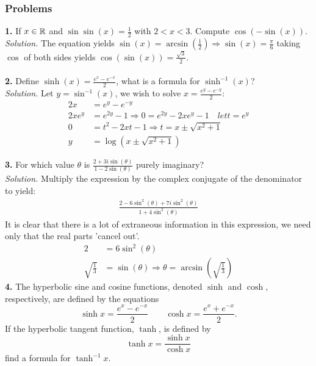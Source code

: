 \subsubsection{Problems}
\textbf{1.} If $x \in \mathbb{R}$ and $\sin\sin(x) = \frac{1}{2}$ with $2 < x < 3$. Compute $\cos(-\sin(x))$.\\

\textit{Solution.} The equation yields $\sin(x) = \arcsin\left(\frac{1}{2}\right) \Rightarrow \sin(x) = \frac{\pi}{6}$ taking $\cos$ of both sides 
yields $\cos(\sin(x)) = \frac{\sqrt{3}}{2}$.\\\\

\textbf{2.} Define $\sinh(x) = \frac{e^{x}-e^{-x}}{2}$, what is a formula for $\sinh^{-1}(x)$?\\

\textit{Solution.} Let $y = \sin^{-1}(x)$, we wish to solve $x = \frac{e^{y}-e^{-y}}{2}$:
\begin{align*}
	2x &= e^{y}-e^{-y}\\
	2xe^{y} &= e^{2y} - 1 \Rightarrow 0 = e^{2y} - 2xe^{y} - 1 \quad let t = e^{y}\\
	0 &= t^2 - 2xt - 1 \Rightarrow t = x \pm \sqrt{x^2 + 1}\\
	y &= \log(x \pm \sqrt{x^2 + 1})
\end{align*}

\textbf{3.} For which value $\theta$ is $\frac{2+3i\sin(\theta)}{1-2\sin(\theta)}$ purely imaginary?\\

\textit{Solution.} Multiply the expression by the complex conjugate of the denominator to yield:
\begin{align*}
	\frac{2 - 6\sin^{2}(\theta)+7i\sin^{2}(\theta)}{1 + 4\sin^{2}(\theta)}
\end{align*}
It is clear that there is a lot of extraneous information in this expression, we need only that the real parts 'cancel out'.
\begin{align*}
	2 &= 6\sin^{2}(\theta)\\
	\sqrt{\frac{1}{3}} &= \sin(\theta) \Rightarrow \theta = \arcsin\left(\sqrt{\frac{1}{3}}\right)
\end{align*}
\textbf{4.} The hyperbolic sine and cosine functions, denoted $\sinh$ and $\cosh$, respectively, are defined by the equations $$\sinh x = \frac{e^x - e^{-x}}{2} \qquad \cosh x = \frac{e^x + e^{-x}}{2}.$$ If the hyperbolic tangent function, $\tanh$, is defined by $$\tanh x = \frac{\sinh x}{\cosh x}$$ find a formula for $\tanh^{-1}x$. \\

